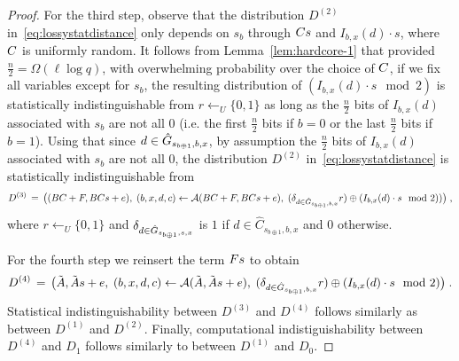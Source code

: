 \begin{proof}
For the third step, observe that the distribution ${D}^{(2)}$ in~\eqref{eq:lossystatdistance} only depends on $s_b$ through $\*C\*s$ and $I_{b,x}(d)\cdot s$, where $\*C$ is uniformly random. It follows from Lemma~\ref{lem:hardcore-1} that provided $\frac{n}{2}=\Omega(\ell\log q)$, with overwhelming probability over the choice of $\*C$, if we fix all variables except for $s_b$, the resulting distribution of $(I_{b,x}(d) \cdot s \mod 2)$ is statistically indistinguishable from $r\leftarrow_U \{0,1\}$ as long as the $\frac{n}{2}$ bits of  $I_{b,x}(d)$ associated with $s_b$ are not all $0$ (i.e. the first $\frac{n}{2}$ bits if $b = 0$ or the last $\frac{n}{2}$ bits if $b = 1$). Using that since $d\in \hat{G}_{s_{b\oplus 1},b,x}$, by assumption the $\frac{n}{2}$ bits of  $I_{b,x}(d)$ associated with $s_b$ are not all $0$,  the distribution 
 ${D}^{(2)}$ in~\eqref{eq:lossystatdistance} is statistically indistinguishable from 
\begin{eqnarray*}
{D}^{(3)} \,=\,\big( (\*B\*C+\*F, \*B\*C\*s + \*e),\; (b,x,d,c)\leftarrow \mathcal{A}(\*B\*C + \*F,\*B\*C\*s + \*e),\; (\delta_{d\in \hat{\dset}_{s_{b\oplus 1},b,x}} r )\oplus (I_{b,x}(d)\cdot s\mod 2))\big)\;, 
\end{eqnarray*}
where $r\leftarrow_U \{0,1\}$ and $\delta_{d\in \hat{G}_{s_{b\oplus 1},s,x}}$ is $1$ if $d\in \hat{C}_{s_{b\oplus 1},b,x}$ and $0$ otherwise. %


For the fourth step we reinsert the term $F\*s$ to obtain
\begin{eqnarray*}
{D}^{(4)} \,=\, \big(\tilde{\*A}, \tilde{\*A}\*s + \*e,\; (b,x,d,c)\leftarrow \mathcal{A}(\tilde{\*A},\tilde{\*A}\*s + \*e),\; (\delta_{d\in \hat{\dset}_{s_{b\oplus 1},b,x}} r) \oplus (I_{b,x}(d) \cdot s\mod 2) \big)\;. 
\end{eqnarray*}
Statistical indistinguishability between ${D}^{(3)}$ and ${D}^{(4)}$ follows similarly as between ${D}^{(1)}$ and ${D}^{(2)}$.
Finally, computational indistiguishability between ${D}^{(4)}$ and ${D}_1$ follows similarly to between ${D}^{(1)}$ and ${D}_0$.
\end{proof}



